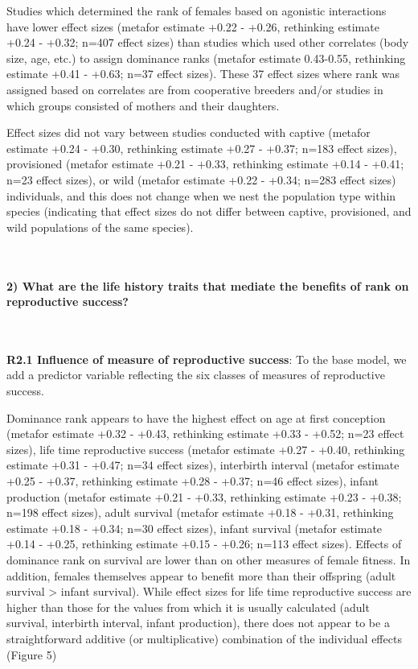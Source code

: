 \documentclass[
]{article}
\begin{document}
Studies which determined the rank of females based on agonistic
interactions have lower effect sizes (metafor estimate +0.22 - +0.26,
rethinking estimate +0.24 - +0.32; n=407 effect sizes) than studies
which used other correlates (body size, age, etc.) to assign dominance
ranks (metafor estimate 0.43-0.55, rethinking estimate +0.41 - +0.63;
n=37 effect sizes). These 37 effect sizes where rank was assigned based
on correlates are from cooperative breeders and/or studies in which
groups consisted of mothers and their daughters.

Effect sizes did not vary between studies conducted with captive
(metafor estimate +0.24 - +0.30, rethinking estimate +0.27 - +0.37;
n=183 effect sizes), provisioned (metafor estimate +0.21 - +0.33,
rethinking estimate +0.14 - +0.41; n=23 effect sizes), or wild (metafor
estimate +0.22 - +0.34; n=283 effect sizes) individuals, and this does
not change when we nest the population type within species (indicating
that effect sizes do not differ between captive, provisioned, and wild
populations of the same species).

~

\hypertarget{what-are-the-life-history-traits-that-mediate-the-benefits-of-rank-on-reproductive-success-2}{%
\paragraph{\texorpdfstring{\textbf{2) What are the life history traits
that mediate the benefits of rank on reproductive
success?}}{2) What are the life history traits that mediate the benefits of rank on reproductive success?}}\label{what-are-the-life-history-traits-that-mediate-the-benefits-of-rank-on-reproductive-success-2}}

~

\textbf{R2.1 Influence of measure of reproductive success}: To the base
model, we add a predictor variable reflecting the six classes of
measures of reproductive success.

Dominance rank appears to have the highest effect on age at first
conception (metafor estimate +0.32 - +0.43, rethinking estimate +0.33 -
+0.52; n=23 effect sizes), life time reproductive success (metafor
estimate +0.27 - +0.40, rethinking estimate +0.31 - +0.47; n=34 effect
sizes), interbirth interval (metafor estimate +0.25 - +0.37, rethinking
estimate +0.28 - +0.37; n=46 effect sizes), infant production (metafor
estimate +0.21 - +0.33, rethinking estimate +0.23 - +0.38; n=198 effect
sizes), adult survival (metafor estimate +0.18 - +0.31, rethinking
estimate +0.18 - +0.34; n=30 effect sizes), infant survival (metafor
estimate +0.14 - +0.25, rethinking estimate +0.15 - +0.26; n=113 effect
sizes). Effects of dominance rank on survival are lower than on other
measures of female fitness. In addition, females themselves appear to
benefit more than their offspring (adult survival \textgreater{} infant
survival). While effect sizes for life time reproductive success are
higher than those for the values from which it is usually calculated
(adult survival, interbirth interval, infant production), there does not
appear to be a straightforward additive (or multiplicative) combination
of the individual effects (Figure 5)
\end{document}
